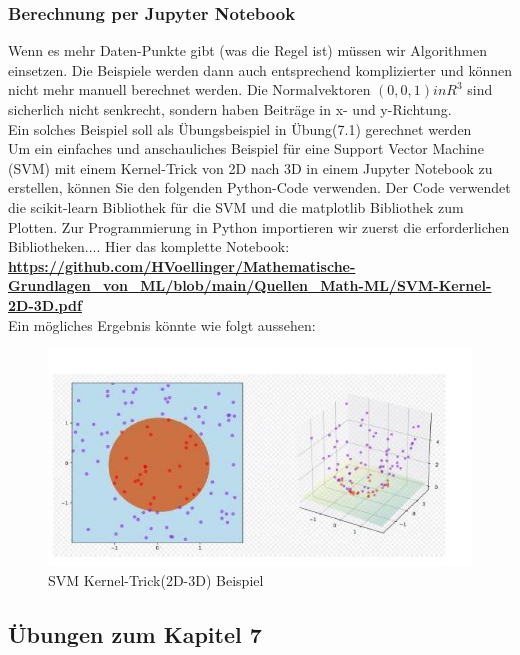 \documentclass[12pt]{article}
\begin{document}
\subsubsection{Berechnung per Jupyter Notebook}
Wenn es mehr Daten-Punkte gibt (was die Regel ist) müssen wir Algorithmen einsetzen. Die Beispiele werden dann auch entsprechend komplizierter und können nicht mehr manuell berechnet werden. Die Normalvektoren $ (0,0,1)in {R}^3 $ sind sicherlich nicht senkrecht, sondern haben Beiträge in x- und y-Richtung.\\
Ein solches Beispiel soll als Übungsbeispiel in Übung(7.1) gerechnet werden\\[0.3cm]
% 
Um ein einfaches und anschauliches Beispiel für eine Support Vector Machine (SVM) mit einem Kernel-Trick von 2D nach 3D in einem Jupyter Notebook zu erstellen, können Sie den folgenden Python-Code verwenden. Der Code 
verwendet die scikit-learn Bibliothek für die SVM und die matplotlib Bibliothek zum Plotten. Zur Programmierung in Python importieren wir zuerst die erforderlichen Bibliotheken.... Hier das komplette Notebook:\\[0.2cm]
\textbf{\url{https://github.com/HVoellinger/Mathematische-Grundlagen_von_ML/blob/main/Quellen_Math-ML/SVM-Kernel-2D-3D.pdf}}\\
Ein mögliches Ergebnis könnte wie folgt aussehen: \\[0.5cm]
\begin{figure}[htp]
  \centering
  \hspace*{-0.1cm} 
  \includegraphics[width=1.\textwidth]{SVM_Kernel-Trick(2D-3D)_Beispiel}
  \caption{SVM Kernel-Trick(2D-3D) Beispiel}    
  \label{fig:SVM_2D-3D}
\end{figure}
%
\newpage

\subsection{Übungen zum Kapitel 7}
\end{document}
